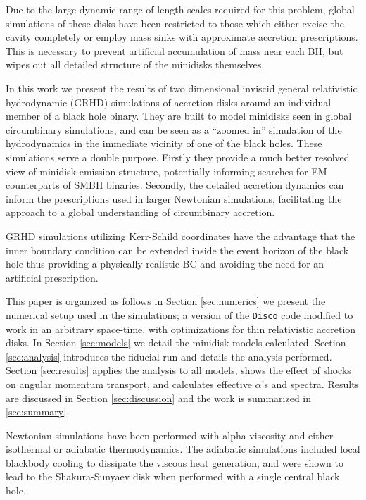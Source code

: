 \documentclass{emulateapj}
\newcommand{\Disco}{{\texttt{Disco}}}
\begin{document}
Due to the large dynamic range of length scales required for this problem, global simulations of these disks have been restricted to those which either excise the cavity completely or employ mass sinks with approximate accretion prescriptions.  This is necessary to prevent artificial accumulation of mass near each BH, but wipes out all detailed structure of the minidisks themselves.


In this work we present the results of two dimensional inviscid general relativistic hydrodynamic (GRHD) simulations of accretion disks around an individual member of a black hole binary. They are built to model minidisks seen in global circumbinary simulations, and can be seen as a ``zoomed in'' simulation of the hydrodynamics in the immediate vicinity of one of the black holes.  These simulations serve a double purpose. Firstly they provide a much better resolved view of minidisk emission structure, potentially informing searches for EM counterparts of SMBH binaries.  Secondly, the detailed accretion dynamics can inform the prescriptions used in larger Newtonian simulations, facilitating the approach to a global understanding of circumbinary accretion.


GRHD simulations utilizing Kerr-Schild coordinates have the advantage that the inner boundary condition can be extended inside the event horizon of the black hole thus providing a physically realistic BC and avoiding the need for an artificial prescription. 

This paper is organized as follows in Section \ref{sec:numerics} we present the
numerical setup used in the simulations; a version of the \Disco{} code 
modified to work in an arbitrary space-time, with optimizations for thin 
relativistic accretion disks.  In Section \ref{sec:models} we detail the 
minidisk models calculated.  Section \ref{sec:analysis} introduces the fiducial run and details the analysis performed.  Section \ref{sec:results} applies the analysis to all models, shows the effect of shocks on angular momentum transport, and calculates effective $\alpha$'s and spectra. Results are discussed in Section \ref{sec:discussion} and the work is summarized in \ref{sec:summary}.



Newtonian simulations have been performed with alpha viscosity and either isothermal \citep{Farris14} or adiabatic \citep{Farris15A, Farris15B} thermodynamics. The adiabatic simulations included local blackbody cooling to dissipate the viscous heat generation, and were shown to lead to the Shakura-Sunyaev disk when performed with a single central black hole.
\end{document}

